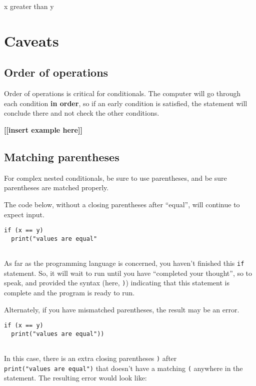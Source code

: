 \documentclass[
]{book}
\begin{document}
x greater than y

\hfill\break

\section{Caveats}\label{caveats-1}

\subsection{Order of operations}\label{order-of-operations}

Order of operations is critical for conditionals. The computer will go through each condition \textbf{in order}, so if an early condition is satisfied, the statement will conclude there and not check the other conditions.

\textbf{{[}{[}insert example here{]}{]}}

\subsection{Matching parentheses}\label{matching-parentheses}

For complex nested conditionals, be sure to use parentheses, and be sure parentheses are matched properly.

The code below, without a closing parentheses after ``equal'', will continue to expect input.

\begin{verbatim}
if (x == y) 
  print("values are equal"
  
\end{verbatim}

As far as the programming language is concerned, you haven't finished this \texttt{if} statement. So, it will wait to run until you have ``completed your thought'', so to speak, and provided the syntax (here, \texttt{)}) indicating that this statement is complete and the program is ready to run.

Alternately, if you have mismatched parentheses, the result may be an error.

\begin{verbatim}
if (x == y) 
  print("values are equal"))
  
\end{verbatim}

In this case, there is an extra closing parentheses \texttt{)} after \texttt{print("values\ are\ equal")} that doesn't have a matching \texttt{(} anywhere in the statement. The resulting error would look like:
\end{document}

